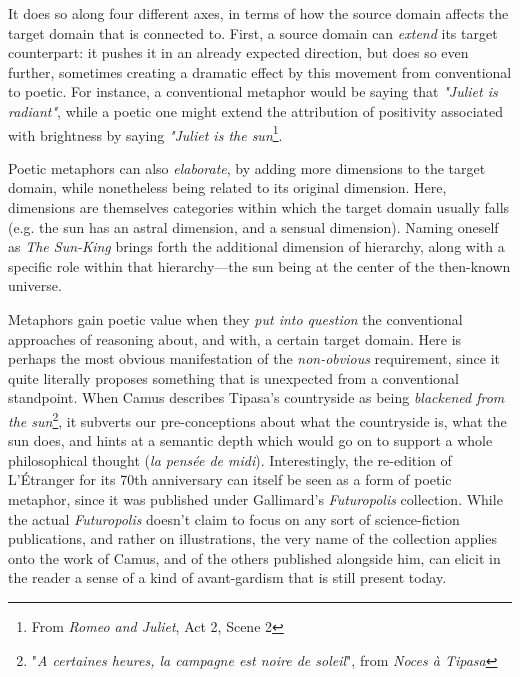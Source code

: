 \documentclass{article}
\begin{document}
It does so along four different axes, in terms of how the source domain affects the target domain that is connected to. First, a source domain can \emph{extend} its target counterpart: it pushes it in an already expected direction, but does so even further, sometimes creating a dramatic effect by this movement from conventional to poetic. For instance, a conventional metaphor would be saying that \emph{"Juliet is radiant"}, while a poetic one might extend the attribution of positivity associated with brightness by saying \emph{"Juliet is the sun}\footnote{From \emph{Romeo and Juliet}, Act 2, Scene 2}.

Poetic metaphors can also \emph{elaborate}, by adding more dimensions to the target domain, while nonetheless being related to its original dimension. Here, dimensions are themselves categories within which the target domain usually falls (e.g. the sun has an astral dimension, and a sensual dimension). Naming oneself as \emph{The Sun-King} brings forth the additional dimension of hierarchy, along with a specific role within that hierarchy—the sun being at the center of the then-known universe.

Metaphors gain poetic value when they \emph{put into question} the conventional approaches of reasoning about, and with, a certain target domain. Here is perhaps the most obvious manifestation of the \emph{non-obvious} requirement, since it quite literally proposes something that is unexpected from a conventional standpoint. When Camus describes Tipasa's countryside as being \emph{blackened from the sun}\footnote{"\emph{A certaines heures, la campagne est noire de soleil}", from \emph{Noces à Tipasa}}, it subverts our pre-conceptions about what the countryside is, what the sun does, and hints at a semantic depth which would go on to support a whole philosophical thought (\emph{la pensée de midi}). Interestingly, the re-edition of L'Étranger for its 70th anniversary can itself be seen as a form of poetic metaphor, since it was published under Gallimard's \emph{Futuropolis} collection. While the actual \emph{Futuropolis} doesn't claim to focus on any sort of science-fiction publications, and rather on illustrations, the very name of the collection applies onto the work of Camus, and of the others published alongside him, can elicit in the reader a sense of a kind of avant-gardism that is still present today.
\end{document}
